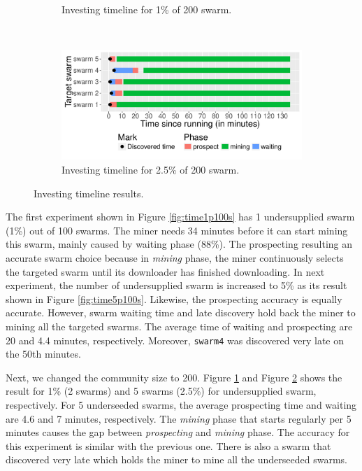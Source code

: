 \begin{figure}[th]
\begin{adjustwidth}{-1.5cm}{}
\begin{subfigure}[t]{0.6\textwidth}
		\caption{Investing timeline for 1\% of 200 swarm.}
		\label{fig:time1p200s}
	\end{subfigure}
	~
	\begin{subfigure}[t]{0.6\textwidth}
		\centering
		\includegraphics[width=\textwidth]{pics/results/time-25p200s.pdf}
		\caption{Investing timeline for 2.5\% of 200 swarm.}
		\label{fig:time2p200s}
	\end{subfigure}
	\caption{Investing timeline results.}
	\label{fig:timeprosexp}
\end{adjustwidth}
\end{figure}

The first experiment shown in Figure \ref{fig:time1p100s} has 1 undersupplied swarm (1\%) out of 100 swarms. The miner needs 34 minutes before it can start mining this swarm, mainly caused by waiting phase (88\%). The prospecting resulting an accurate swarm choice because in \textit{mining} phase, the miner continuously selects the targeted swarm until its downloader has finished downloading. In next experiment, the number of undersupplied swarm is increased to 5\% as its result shown in Figure \ref{fig:time5p100s}. Likewise, the prospecting accuracy is equally accurate. However, swarm waiting time and late discovery hold back the miner to mining all the targeted swarms. The average time of waiting and prospecting are 20 and 4.4 minutes, respectively. Moreover, \texttt{swarm4} was discovered very late on the 50th minutes.

Next, we changed the community size to 200. Figure \ref{fig:time1p200s} and Figure \ref{fig:time2p200s} shows the result for 1\% (2 swarms) and 5 swarms (2.5\%) for undersupplied swarm, respectively. For 5 underseeded swarms, the average prospecting time and waiting are 4.6 and 7 minutes, respectively. The \textit{mining} phase that starts regularly per 5 minutes causes the gap between \textit{prospecting} and \textit{mining} phase. The accuracy for this experiment is similar with the previous one. There is also a swarm that discovered very late which holds the miner to mine all the underseeded swarms.

